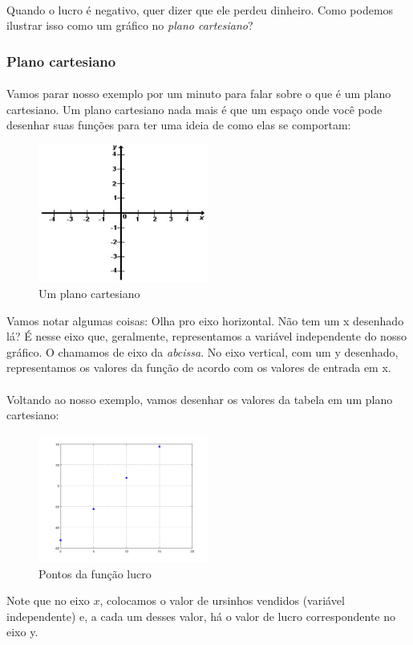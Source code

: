 \documentclass[11pt]{article}
\begin{document}
\paragraph{}
Quando o lucro é negativo, quer dizer que ele perdeu dinheiro. 
Como podemos ilustrar isso como um gráfico no \emph{plano cartesiano}? 
\subsubsection{Plano cartesiano}
\paragraph{}
Vamos parar nosso exemplo por um minuto para falar sobre o que é um plano
cartesiano. Um plano cartesiano nada mais é que um espaço onde você pode 
desenhar suas funções para ter uma ideia de como elas se comportam:
\begin{figure}[H]
  		\centering
    	\includegraphics[width=0.5\textwidth]{imgs/plano_cartesiano.jpg}
		\caption[9pt]{Um plano cartesiano}
\end{figure}
Vamos notar algumas coisas: Olha pro eixo horizontal. Não tem um x desenhado 
lá? É nesse eixo que, geralmente, representamos a variável independente do 
nosso gráfico. O chamamos de eixo da \emph{abcissa}. No eixo vertical, com
um y desenhado, representamos os valores da função de acordo com os valores
de entrada em x.
\paragraph{}
Voltando ao nosso exemplo, vamos desenhar os valores da tabela em um plano
cartesiano:
\begin{figure}[H]
  		\centering
    	\includegraphics[width=0.5\textwidth]{imgs/grafico.png}
		\caption[9pt]{Pontos da função lucro}
\end{figure}
Note que no eixo $x$, colocamos o valor de ursinhos vendidos (variável 
independente) e, a cada um desses valor, há o valor de lucro correspondente
no eixo y.
\end{document}
